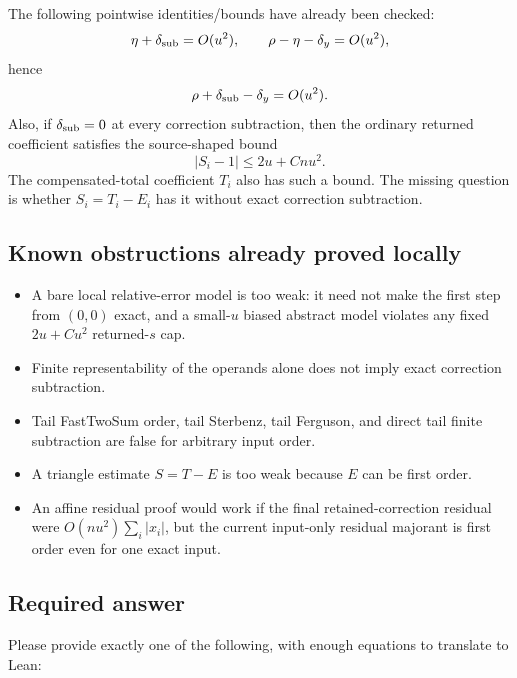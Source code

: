 \documentclass{article}
\begin{document}
The following pointwise identities/bounds have already been checked:
\[
\eta+\delta_{\rm sub}=O(u^2),\qquad
\rho-\eta-\delta_y=O(u^2),
\]
hence
\[
\rho+\delta_{\rm sub}-\delta_y=O(u^2).
\]
Also, if \(\delta_{\rm sub}=0\) at every correction subtraction, then the
ordinary returned coefficient satisfies the source-shaped bound
\[
|S_i-1|\le 2u+C n u^2.
\]
The compensated-total coefficient \(T_i\) also has such a bound.  The missing
question is whether \(S_i=T_i-E_i\) has it without exact correction subtraction.

\subsection*{Known obstructions already proved locally}

\begin{itemize}
\item A bare local relative-error model is too weak: it need not make the first
step from \((0,0)\) exact, and a small-\(u\) biased abstract model violates any
fixed \(2u+C u^2\) returned-\(s\) cap.
\item Finite representability of the operands alone does not imply exact
correction subtraction.
\item Tail FastTwoSum order, tail Sterbenz, tail Ferguson, and direct tail
finite subtraction are false for arbitrary input order.
\item A triangle estimate \(S=T-E\) is too weak because \(E\) can be first order.
\item An affine residual proof would work if the final retained-correction
residual were \(O(nu^2)\sum_i |x_i|\), but the current input-only residual
majorant is first order even for one exact input.
\end{itemize}

\subsection*{Required answer}

Please provide exactly one of the following, with enough equations to translate
to Lean:
\end{document}
